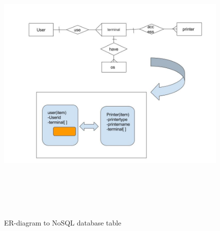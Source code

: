  \begin{figure}[h]
 \includegraphics[width=15cm, height=14cm]{2.jpg}
 \centering
 \caption{\label{fig:1}ER-diagram to NoSQL database table}
 \end{figure}

